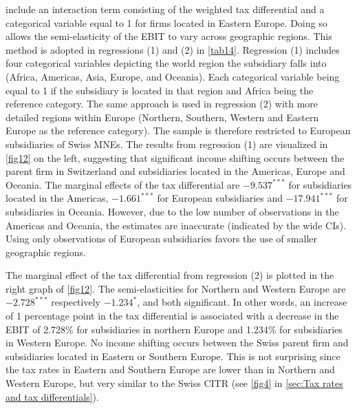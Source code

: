 \documentclass[10pt,twocolumn,oneside,cmyk]{article}
\begin{document}
\textcite[1173]{huizinga_international_2008} include an interaction term consisting of the weighted tax differential and a categorical variable equal to 1 for firms located in Eastern Europe. Doing so allows the semi-elasticity of the EBIT to vary across geographic regions. This method is adopted in regressions (1) and (2) in \cref{tab14}. Regression (1) includes four categorical variables depicting the world region the subsidiary falls into (Africa, Americas, Asia, Europe, and Oceania). Each categorical variable being equal to 1 if the subsidiary is located in that region and Africa being the reference category. The same approach is used in regression (2) with more detailed regions within Europe (Northern, Southern, Western and Eastern Europe as the reference category). The sample is therefore restricted to European subsidiaries of Swiss MNEs. The results from regression (1) are visualized in \cref{fig12} on the left, suggesting that significant income shifting occurs between the parent firm in Switzerland and subsidiaries located in the Americas, Europe and Oceania. The marginal effects of the tax differential are $-9.537^{***}$ for subsidiaries located in the Americas, $-1.661^{***}$ for European subsidiaries and $-17.941^{***}$ for subsidiaries in Oceania. However, due to the low number of observations in the Americas and Oceania, the estimates are inaccurate (indicated by the wide CIs). Using only observations of European subsidiaries favors the use of smaller geographic regions.

The marginal effect of the tax differential from regression (2) is plotted in the right graph of \cref{fig12}. The semi-elasticities for Northern and Western Europe are $-2.728^{***}$ respectively $-1.234^*$, and both significant. In other words, an increase of 1 percentage point in the tax differential is associated with a decrease in the EBIT of 2.728\% for subsidiaries in northern Europe and 1.234\% for subsidiaries in Western Europe. No income shifting occurs between the Swiss parent firm and subsidiaries located in Eastern or Southern Europe. This is not surprising since the tax rates in Eastern and Southern Europe are lower than in Northern and Western Europe, but very similar to the Swiss CITR (see \cref{fig4} in \cref{sec:Tax rates and tax differentials}).
\end{document}
